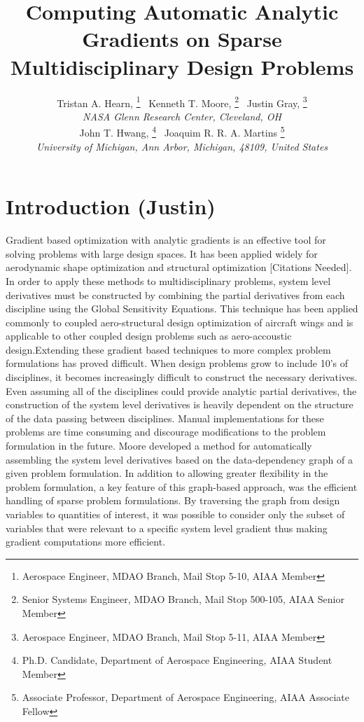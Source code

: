 \documentclass[]{aiaa-tc} %
\title{Computing Automatic Analytic Gradients on Sparse Multidisciplinary Design Problems }
\author{
  Tristan A. Hearn,%
     \thanks{Aerospace Engineer, MDAO Branch, Mail Stop 5-10, AIAA Member}
  \ Kenneth T. Moore,%
     \thanks{Senior Systems Engineer, MDAO Branch, Mail Stop 500-105, AIAA Senior Member}
  \ Justin Gray,%
     \thanks{Aerospace Engineer, MDAO Branch, Mail Stop 5-11, AIAA Member}
   \\
  {\normalsize\itshape
  NASA Glenn Research Center, Cleveland, OH}  \\
  John T. Hwang,%
  \thanks{Ph.D. Candidate, Department of Aerospace Engineering, AIAA Student Member}
  \ Joaquim R. R. A. Martins%
  \thanks{Associate Professor, Department of Aerospace Engineering, AIAA Associate Fellow}
  \\
  {\normalsize\itshape
   University of Michigan, Ann Arbor, Michigan, 48109, United States}
}
\begin{document}
  \maketitle

  \begin{abstract}

  \end{abstract}

  \section{Introduction (Justin)}

    Gradient based optimization with analytic gradients is an effective tool for solving problems 
    with large design spaces. It has been applied widely for aerodynamic shape optimization \cite{Liou2010,palacios2012adjoint}
    and structural optimization [Citations Needed]. 
    In order to apply these methods to multidisciplinary problems, system level derivatives must be 
    constructed by combining the partial derivatives from each discipline using the Global Sensitivity 
    Equations\cite{Sobieski1990}. This technique has been applied commonly to coupled 
    aero-structural design optimization of aircraft wings\cite{Kenway2012c, Haghighat2012} and is applicable to 
    other coupled design problems such as aero-accoustic design\cite{economon2012coupled}.Extending these 
    gradient based techniques to more complex problem formulations has proved difficult. When 
    design problems grow to include 10's of disciplines, it becomes increasingly difficult to construct the 
    necessary derivatives. Even assuming all of the disciplines could provide analytic partial derivatives, 
    the construction of the system level derivatives is heavily dependent on the structure of the data passing 
    between disciplines. Manual implementations for these problems are time consuming and discourage modifications 
    to the problem formulation in the future. Moore developed a method for automatically assembling the system 
    level derivatives based on the data-dependency graph of a given problem formulation\cite{openmdao_derivatives}. 
    In addition to allowing greater flexibility in the problem formulation, a key feature of this graph-based approach, was the efficient 
    handling of sparse problem formulations. By traversing the graph from design variables to quantities of interest, 
    it was possible to consider only the subset of variables that were relevant to a specific system level gradient thus 
    making gradient computations more efficient. 
\end{document}
